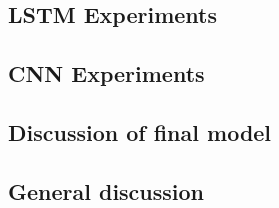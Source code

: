 \subsection{LSTM Experiments}


\subsection{CNN Experiments}


\subsection{Discussion of final model}
\subsection{General discussion}
